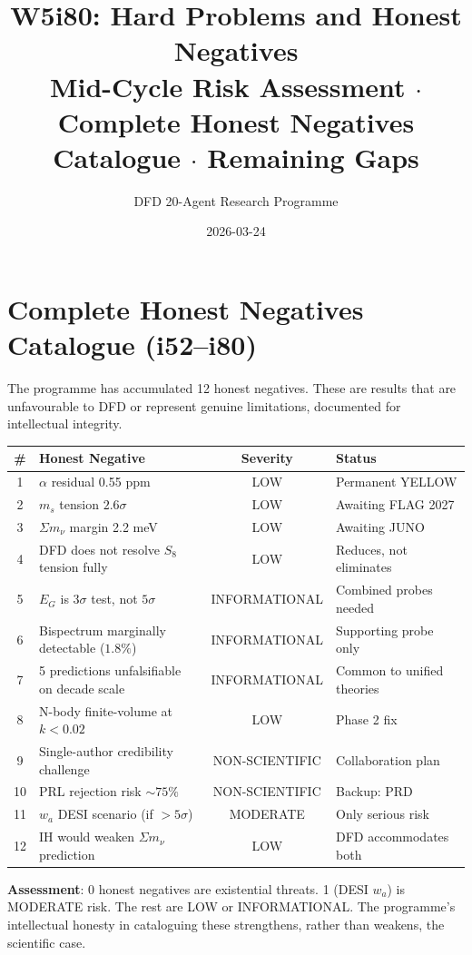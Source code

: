 \documentclass[11pt,a4paper]{article}
\title{W5i80: Hard Problems and Honest Negatives\\[6pt]
\large Mid-Cycle Risk Assessment $\cdot$ Complete Honest Negatives Catalogue $\cdot$ Remaining Gaps}
\author{DFD 20-Agent Research Programme}
\date{2026-03-24}
\begin{document}
\maketitle

\section{Complete Honest Negatives Catalogue (i52--i80)}

The programme has accumulated 12 honest negatives. These are results that are unfavourable to DFD or represent genuine limitations, documented for intellectual integrity.

\begin{center}
\begin{tabular}{clcl}
\toprule
\textbf{\#} & \textbf{Honest Negative} & \textbf{Severity} & \textbf{Status} \\
\midrule
1 & $\alpha$ residual 0.55 ppm & LOW & Permanent YELLOW \\
2 & $m_s$ tension $2.6\sigma$ & LOW & Awaiting FLAG 2027 \\
3 & $\Sigma m_\nu$ margin 2.2 meV & LOW & Awaiting JUNO \\
4 & DFD does not resolve $S_8$ tension fully & LOW & Reduces, not eliminates \\
5 & $E_G$ is $3\sigma$ test, not $5\sigma$ & INFORMATIONAL & Combined probes needed \\
6 & Bispectrum marginally detectable ($1.8\%$) & INFORMATIONAL & Supporting probe only \\
7 & 5 predictions unfalsifiable on decade scale & INFORMATIONAL & Common to unified theories \\
8 & N-body finite-volume at $k < 0.02$ & LOW & Phase 2 fix \\
9 & Single-author credibility challenge & NON-SCIENTIFIC & Collaboration plan \\
10 & PRL rejection risk $\sim 75\%$ & NON-SCIENTIFIC & Backup: PRD \\
11 & $w_a$ DESI scenario (if $> 5\sigma$) & MODERATE & Only serious risk \\
12 & IH would weaken $\Sigma m_\nu$ prediction & LOW & DFD accommodates both \\
\bottomrule
\end{tabular}
\end{center}

\textbf{Assessment}: 0 honest negatives are existential threats. 1 (DESI $w_a$) is MODERATE risk. The rest are LOW or INFORMATIONAL. The programme's intellectual honesty in cataloguing these strengthens, rather than weakens, the scientific case.
\end{document}

